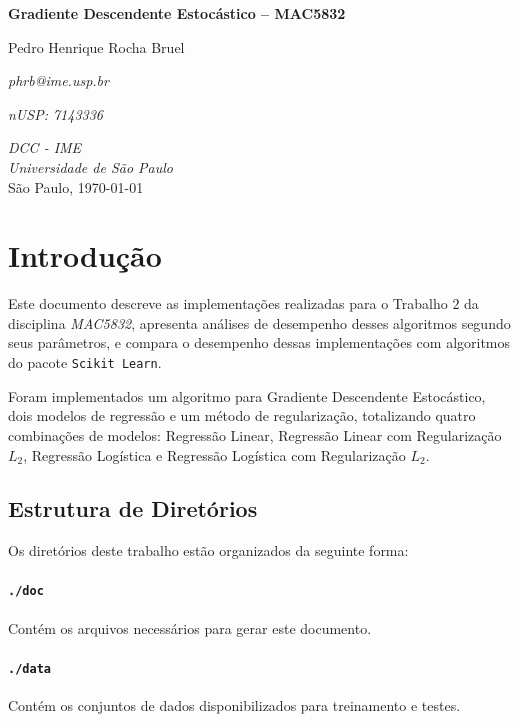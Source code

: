 \documentclass[a4paper, 12pt]{article}
\begin{document}
\begin{titlepage}
    \centering
    \vspace*{4cm}
    \textbf{\huge{Gradiente Descendente Estocástico -- MAC5832}}\\

    \vskip 1cm

    Pedro Henrique Rocha Bruel

    \emph{phrb@ime.usp.br}

    \emph{nUSP: 7143336}

    \vfill
    \normalsize{\emph{DCC - IME\\
    Universidade de São Paulo}\\}
    \normalsize{São Paulo, \today}
\end{titlepage}

\section{Introdução} \label{sec:intro}

Este documento descreve as implementações realizadas para o Trabalho $2$ da
disciplina \textit{MAC5832}, apresenta análises de desempenho desses algoritmos
segundo seus parâmetros, e compara o desempenho dessas implementações com
algoritmos do pacote \texttt{Scikit Learn}.

Foram implementados um algoritmo para Gradiente Descendente Estocástico, dois
modelos de regressão e um método de regularização, totalizando quatro
combinações de modelos: Regressão Linear, Regressão Linear com Regularização
$L_2$, Regressão Logística e Regressão Logística com Regularização $L_2$.

\subsection{Estrutura de Diretórios}

Os diretórios deste trabalho estão organizados da
seguinte forma:

\paragraph{\texttt{./doc}} Contém os arquivos necessários
para gerar este documento.

\paragraph{\texttt{./data}} Contém os conjuntos de dados
disponibilizados para treinamento e testes.
\end{document}
